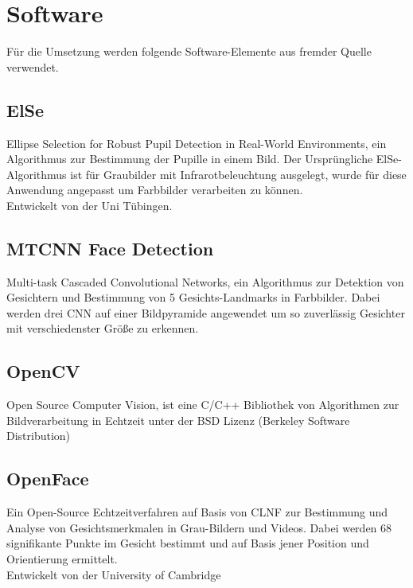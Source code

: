 \section{Software}
Für die Umsetzung werden folgende Software-Elemente aus fremder Quelle verwendet.
\subsection{ElSe}
Ellipse Selection for Robust Pupil Detection in Real-World Environments, ein Algorithmus zur Bestimmung der Pupille in einem Bild. Der Ursprüngliche ElSe-Algorithmus ist für Graubilder mit Infrarotbeleuchtung ausgelegt, wurde für diese Anwendung angepasst um Farbbilder verarbeiten zu können.\\
Entwickelt von der Uni Tübingen. \cite{ElSe}
\subsection{MTCNN Face Detection}
Multi-task Cascaded Convolutional Networks, ein Algorithmus zur Detektion von Gesichtern und Bestimmung von 5 Gesichts-Landmarks in Farbbilder. Dabei werden drei CNN auf einer Bildpyramide angewendet um so zuverlässig Gesichter mit verschiedenster Größe zu erkennen.\\
\cite{MTCCN}
\subsection{OpenCV}
Open Source Computer Vision, ist eine C/C++ Bibliothek von Algorithmen zur Bildverarbeitung in Echtzeit unter der BSD Lizenz (Berkeley
Software Distribution)\\
\cite{wiki_Wha_is_OPenCV}\cite{OpenCv_What_Is}
\subsection{OpenFace}
Ein Open-Source Echtzeitverfahren auf Basis von CLNF zur Bestimmung und Analyse von Gesichtsmerkmalen in Grau-Bildern und Videos. Dabei werden 68 signifikante Punkte im Gesicht bestimmt und auf Basis jener Position und Orientierung ermittelt.\\
Entwickelt von der University of Cambridge \cite{OpenFace}
